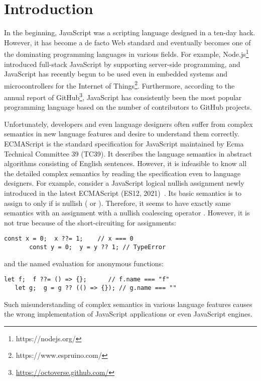 \section{Introduction}\label{sec:intro}

In the beginning, JavaScript was a scripting language designed in a ten-day
hack. However, it has become a de facto Web standard and eventually becomes one
of the dominating programming languages in various fields. For example,
Node.js\footnote{https://nodejs.org/} introduced full-stack JavaScript by
supporting server-side programming, and JavaScript has recently begun to be used
even in embedded systems and microcontrollers for the Internet of
Things\footnote{https://www.espruino.com/}. Furthermore, according to the annual
report of GitHub\footnote{\url{https://octoverse.github.com/}}, JavaScript has
consistently been the most popular programming language based on the number of
contributors to GitHub projects.

Unfortunately, developers and even language designers often suffer from complex
semantics in new language features and desire to understand them correctly.
ECMAScript is the standard specification for JavaScript maintained by Ecma
Technical Committee 39 (TC39). It describes the language semantics in abstract
algorithms consisting of English sentences. However, it is infeasible to know
all the detailed complex semantics by reading the specification even to language
designers. For example, consider a JavaScript logical nullish assignment
 newly introduced in the latest ECMAScript (ES12,
2021)~\cite{es12}. Its basic semantics is to assign  to 
only if  is nullish ( or ). Therefore,
it seems to have exactly same semantics with an assignment 
with a nullish coalescing operator .  However, it is not true because
of the short-circuiting for assignments:
\begin{lstlisting}[style=JS]
       const x = 0;  x ??= 1;    // x === 0
       const y = 0;  y = y ?? 1; // TypeError
\end{lstlisting}
and the named evaluation for anonymous functions:
\begin{lstlisting}[style=JS]
   let f;  f ??= () => {};      // f.name === "f"
   let g;  g = g ?? (() => {}); // g.name === ""
\end{lstlisting}
Such misunderstanding of complex semantics in various language features causes
the wrong implementation of JavaScript applications or even JavaScript engines.

